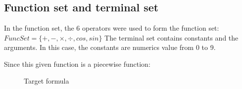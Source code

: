 \documentclass[11pt, a4paper, oneside, openright]{article}
\begin{document}
\subsection{Function set and terminal set}
In the function set, the 6 operators were used to form the function set:
\newline \hspace*{4cm} $FuncSet = \{+, -, \times, \div, cos, sin\}$
\newline The terminal set contains constants and the arguments. In this case, the constants are numerics value from 0 to 9. 

Since this given function is a piecewise function:
  \begin{figure}[!ht]
  \centerline{}
  \caption{Target formula}
  \label{fig:formula}
  \end{figure}
\end{document}

